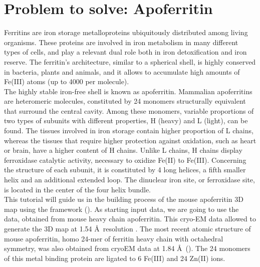 
\section{Problem to solve: Apoferritin}

Ferritins are iron storage metalloproteins ubiquitously distributed among living organisms. These proteins are involved in iron metabolism in many different types of cells, and play a relevant dual role both in iron detoxification and iron reserve. The ferritin's architecture, similar to a spherical shell, is highly conserved in bacteria, plants and animals, and it allows to accumulate high amounts of Fe(III) atoms (up to 4000 per molecule). \\

The highly stable iron-free shell is known as apoferritin. Mammalian apoferritins are heteromeric molecules, constituted by 24 monomers structurally equivalent that surround the central cavity. Among these monomers, variable proportions of two types of subunits with different properties, H (heavy) and L (light), can be found. The tissues involved in iron storage contain higher proportion of L chains, whereas the tissues that require higher protection against oxidation, such as heart or brain, have a higher content of H chains. Unlike L chains, H chains display ferroxidase catalytic activity, necessary to oxidize Fe(II) to Fe(III). Concerning the structure of each subunit, it is constituted by 4 long helices, a fifth smaller helix and an additional extended loop. The dinuclear iron site, or ferroxidase site, is located in the center of the four helix bundle.\\

This tutorial will guide us in the building process of the mouse apoferritin 3D map using the \scipion framework (). As starting input data, we are going to use the  data, obtained from mouse heavy chain apoferritin. This cryo-EM data allowed to generate the 3D map  at 1.54 \AA\ resolution \citep{hamaguchi2019}. The most recent atomic structure of mouse apoferritin, homo 24-mer of ferritin heavy chain with octahedral symmetry, was also obtained from cryo\-EM data at 1.84 \AA\ (). The 24 monomers of this metal binding protein are ligated to 6 Fe(III) and 24 Zn(II) ions.

